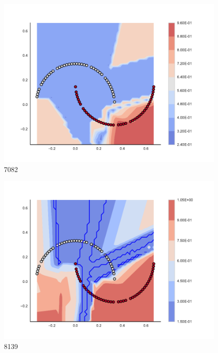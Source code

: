 \begin{subfigure}[b]{0.09\textwidth}
    \includegraphics[width=\textwidth]{img/convergence/7082.pdf}
    \caption{7082}
    \label{fig:convergence_7082}
\end{subfigure}
%
\begin{subfigure}[b]{0.09\textwidth}
    \includegraphics[width=\textwidth]{img/convergence/8139.pdf}
    \caption{8139}
    \label{fig:convergence_8139}
\end{subfigure}
%
